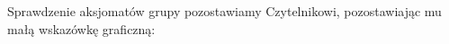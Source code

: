 Sprawdzenie aksjomatów grupy pozostawiamy Czytelnikowi,
pozostawiając mu małą wskazówkę graficzną:
\begin{comment}
\[
    \begin{tikzpicture}[baseline=-0.65ex, scale=0.2]
    \begin{knot}[clip width=5, end tolerance=1pt]
        \strand[semithick] (-6, 0) .. controls (-4, 0) and (-5, 2) .. (-3, 2);
        \strand[semithick] (-6, 2) .. controls (-4, 2) and (-5, 0) .. (-3, 0);
        \strand[semithick] (-6, -2) to (-3, -2);
        \strand[semithick] (-3, 0) .. controls (-1, 0) and (-2, -2) .. (0, -2);
        \strand[semithick] (-3, -2) .. controls (-1, -2) and (-2, 0) .. (0, 0);
        \strand[semithick] (-3, 2) to (0, 2);
        \strand[semithick] (+6, 0) .. controls (+4, 0) and (+5, 2) .. (+3, 2);
        \strand[semithick] (+6, 2) .. controls (+4, 2) and (+5, 0) .. (+3, 0);
        \strand[semithick] (+6, -2) to (+3, -2);
        \strand[semithick] (+3, 0) .. controls (+1, 0) and (+2, -2) .. (0, -2);
        \strand[semithick] (+3, -2) .. controls (+1, -2) and (+2, 0) .. (0, 0);
        \strand[semithick] (+3, 2) to (0, 2);
        \draw (+6, -3) rectangle (0, 3);
        \draw (-6, -3) rectangle (0, 3);
        \draw[semithick, decoration={brace,mirror,raise=3pt},decorate]  (-5.75, -3) -- node[below=6pt] {$\beta$} (-0.25, -3);
        \draw[semithick, decoration={brace,mirror,raise=3pt},decorate]  (0.25, -3) -- node[below=6pt] {$\beta^{-1}$} (5.75, -3);
    \end{knot}
    \end{tikzpicture}
    \cong
    \begin{tikzpicture}[baseline=-0.65ex, scale=0.2]
        \draw[semithick] (-3, -2) to (3, -2);
        \draw[semithick] (-3, 0) to (3, 0);
        \draw[semithick] (-3, 2) to (3, 2);
        \draw (-3, -3) rectangle (3, 3);
        \draw[semithick, decoration={brace,mirror,raise=3pt},decorate]  (-2.75, -3) -- node[below=6pt] {$1_3$} (2.75, -3);
    \end{tikzpicture}
    \quad\quad\quad
    \begin{tikzpicture}[baseline=-0.65ex, scale=0.2]
        \useasboundingbox (-6, -3) rectangle (12, 5);
\begin{knot}[clip width=5, end tolerance=1pt]
        \strand[semithick] (-6, 0) .. controls (-4, 0) and (-5, 2) .. (-3, 2);
        \strand[semithick] (-6, 2) .. controls (-4, 2) and (-5, 0) .. (-3, 0);
        \strand[semithick] (-6, -2) to (-3, -2);
        \strand[semithick] (-3, 0) .. controls (-1, 0) and (-2, -2) .. (0, -2);

\end{comment}
